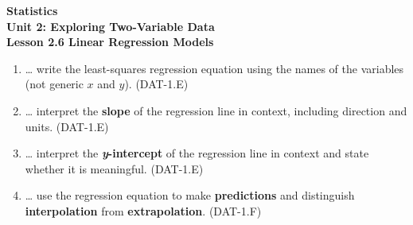 \documentclass[10pt]{article}
\begin{document}
\vspace{-0.8in}

\begin{center}
  {\color{white}\textbf{\LARGE Statistics}}\\[4pt]
  {\color{skymid}\large\textbf{Unit 2: Exploring Two-Variable Data}}\\[6pt]
  {\color{white}\textbf{\large Lesson 2.6 \quad Linear Regression Models}}
\end{center}

\vspace{0.22in}
\namedateperiod
\vspace{0.18in}

\begin{learningtargetbox}
\small
\begin{enumerate}[leftmargin=1.5em, itemsep=5pt]
  \item \ldots{} write the least-squares regression equation using the names of the variables
        (not generic $x$ and $y$). \hfill\textcolor{slate}{\small(DAT-1.E)}
  \item \ldots{} interpret the \textbf{slope} of the regression line in context, including
        direction and units. \hfill\textcolor{slate}{\small(DAT-1.E)}
  \item \ldots{} interpret the \textbf{\textit{y}-intercept} of the regression line in context
        and state whether it is meaningful. \hfill\textcolor{slate}{\small(DAT-1.E)}
  \item \ldots{} use the regression equation to make \textbf{predictions} and distinguish
        \textbf{interpolation} from \textbf{extrapolation}. \hfill\textcolor{slate}{\small(DAT-1.F)}
\end{enumerate}
\end{learningtargetbox}

\vspace{0.14in}
\end{document}
